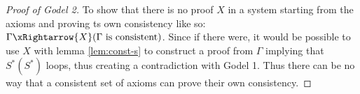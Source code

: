 \begin{proof}[Proof of Godel 2]
To show that there is no proof $X$ in a system starting from the axioms and proving ts own consistency like so: $\Gamma \xRightarrow{X} (\Gamma \text{ is consistent})$. Since if there were, it would be possible to use $X$ with lemma \ref{lem:const-s} to construct a proof from $\Gamma$ implying that $S^*(S^*)$ loops, thus creating a contradiction with Godel 1. Thus there can be no way that a consistent set of axioms can prove their own consistency.
\end{proof}

